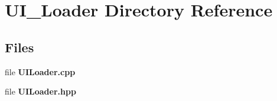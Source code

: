 \section{U\+I\+\_\+\+Loader Directory Reference}
\label{dir_b56e4ae0016a96d26da6a8cb95a10c36}
\subsection*{Files}
\begin{DoxyCompactItemize}
\item 
file \textbf{ U\+I\+Loader.\+cpp}
\item 
file \textbf{ U\+I\+Loader.\+hpp}
\end{DoxyCompactItemize}
